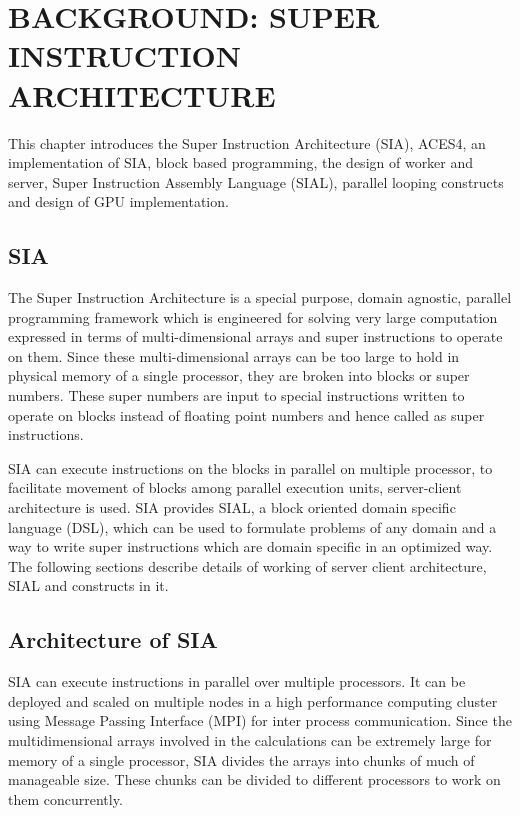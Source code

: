 \chapter{BACKGROUND: SUPER INSTRUCTION ARCHITECTURE} \label{background}

This chapter introduces the Super Instruction Architecture (SIA), ACES4, an
implementation of SIA, block based programming, the design of worker and server,
Super Instruction Assembly Language (SIAL), parallel looping constructs and
design of GPU implementation.

\section{SIA}
The Super Instruction Architecture is a special purpose, domain agnostic,
parallel programming framework which is engineered for solving very large
computation expressed in terms of multi-dimensional arrays and super
instructions to operate on them. Since these multi-dimensional arrays can be too
large to hold in physical memory of a single processor, they are broken into
blocks or super numbers. These super numbers are input to special instructions
written to operate on blocks instead of floating point numbers and hence called
as super instructions.

SIA can execute instructions on the blocks in parallel on multiple processor, to
facilitate movement of blocks among parallel execution units, server-client
architecture is used. SIA provides SIAL, a block oriented domain specific
language (DSL), which can be used to formulate problems of any domain and a way
to write super instructions which are domain specific in an optimized way. The
following sections describe details of working of server client architecture,
SIAL and constructs in it.

\section{Architecture of SIA}
SIA can execute instructions in parallel over multiple processors. It can be
deployed and scaled on multiple nodes in a high performance computing cluster
using Message Passing Interface (MPI) for inter process communication. Since the
multidimensional arrays involved in the calculations can be extremely large for
memory of a single processor, SIA divides the arrays into chunks of much of
manageable size. These chunks can be divided to different processors to work on
them concurrently.

